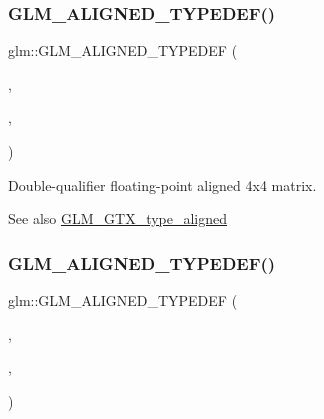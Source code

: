 \subsubsection{\texorpdfstring{G\+L\+M\+\_\+\+A\+L\+I\+G\+N\+E\+D\+\_\+\+T\+Y\+P\+E\+D\+E\+F()}{GLM\_ALIGNED\_TYPEDEF()}\hspace{0.1cm}{\footnotesize\ttfamily [204/209]}}
{\footnotesize\ttfamily glm\+::\+G\+L\+M\+\_\+\+A\+L\+I\+G\+N\+E\+D\+\_\+\+T\+Y\+P\+E\+D\+EF (\begin{DoxyParamCaption}\item[{\mbox{\hyperlink{group__gtc__type__precision_ga5fc21633b1546e4599609c47b4c8dac4}{f64mat4x4}}}]{,  }\item[{aligned\+\_\+f64mat4x4}]{,  }\item[{32}]{ }\end{DoxyParamCaption})}

Double-\/qualifier floating-\/point aligned 4x4 matrix. \begin{DoxySeeAlso}{See also}
\mbox{\hyperlink{group__gtx__type__aligned}{G\+L\+M\+\_\+\+G\+T\+X\+\_\+type\+\_\+aligned}} 
\end{DoxySeeAlso}
\mbox{\label{group__gtx__type__aligned_gafd945a8ea86b042aba410e0560df9a3d}} 
\subsubsection{\texorpdfstring{G\+L\+M\+\_\+\+A\+L\+I\+G\+N\+E\+D\+\_\+\+T\+Y\+P\+E\+D\+E\+F()}{GLM\_ALIGNED\_TYPEDEF()}\hspace{0.1cm}{\footnotesize\ttfamily [205/209]}}
{\footnotesize\ttfamily glm\+::\+G\+L\+M\+\_\+\+A\+L\+I\+G\+N\+E\+D\+\_\+\+T\+Y\+P\+E\+D\+EF (\begin{DoxyParamCaption}\item[{\mbox{\hyperlink{namespaceglm_ac1f6a5957091b849730ea6f05a6b7ad6}{quat}}}]{,  }\item[{aligned\+\_\+quat}]{,  }\item[{16}]{ }\end{DoxyParamCaption})}

